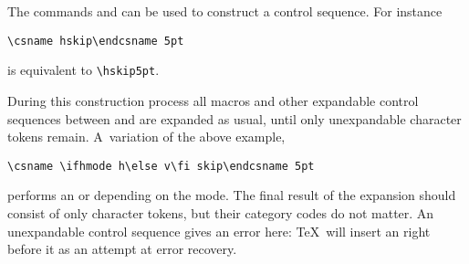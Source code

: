 The commands  and  can be used
to construct a control sequence. 
For instance
\begin{verbatim}
\csname hskip\endcsname 5pt
\end{verbatim}
is equivalent to \verb=\hskip5pt=.

During this construction process
all macros and other expandable control sequences
between  and 
are expanded as usual, until only unexpandable
character tokens remain. A~variation of the above example,
\begin{verbatim}
\csname \ifhmode h\else v\fi skip\endcsname 5pt
\end{verbatim}
performs an  or  depending on the mode.
The final result of the expansion should 
consist of only character tokens, but
their category codes do not matter.
An unexpandable control sequence gives an error here:
\TeX\ will insert an  right before it
as an attempt at error recovery.

